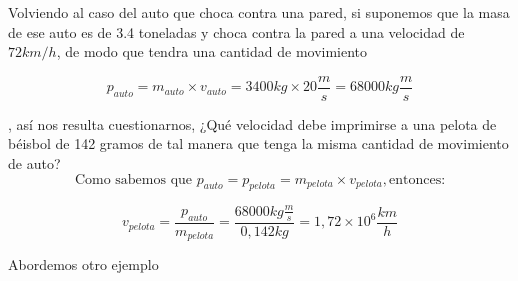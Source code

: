 \vspace{0.2cm}
\begin{tcolorbox}
Volviendo al caso del auto que choca contra una pared, si suponemos que la masa de ese auto es de 3.4 toneladas y choca contra la pared a una velocidad de $72 km/h$, de modo que tendra una cantidad de movimiento

\begin{equation*}
p_{auto}= m_{auto}\times v_{auto}= 3400 kg \times 20\frac{m}{s}= 68000 kg\frac{m}{s}
\end{equation*}  

, así nos resulta cuestionarnos, ¿Qué velocidad debe imprimirse a una pelota de béisbol de 142 gramos de tal manera que tenga la misma cantidad de movimiento de auto?\\

\begin{equation*}
\text{Como sabemos que } p_{auto}=p_{pelota}=m_{pelota}\times v_{pelota},\text{entonces:}
\end{equation*}

\begin{equation*}
v_{pelota}=\frac{p_{auto}}{m_{pelota}}=\frac{68000 kg\frac{m}{s}}{0,142 kg}= 1,72\times 10^{6} \frac{km}{h}  
\end{equation*}
\end{tcolorbox}
\vspace{0.2cm}

Abordemos otro ejemplo 

